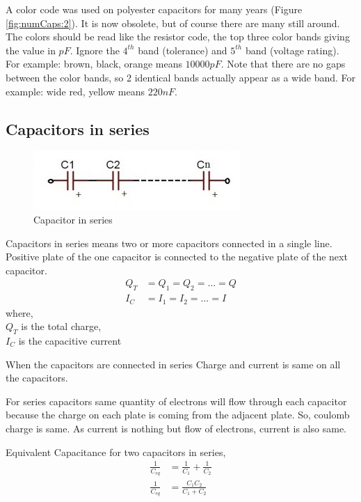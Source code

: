 			A color code was used on polyester capacitors for many years (Figure \ref{fig:numCaps:2}). It is now obsolete, but of course there are many still around. The colors should be read like the resistor code, the top three color bands giving the value in $pF$. Ignore the $4^{th}$ band (tolerance) and $5^{th}$ band (voltage rating). For example: brown, black, orange means $10000pF$. Note that there are no gaps between the color bands, so 2 identical bands actually appear as a wide band. For example: wide red, yellow means $220nF$.
			
		\subsection{Capacitors in series}
			\begin{figure}[h]
				\centering
				\includegraphics[width=0.5\linewidth]{img/exp2/10}
				\caption{Capacitor in series}
				\label{fig:capsInSeries}
			\end{figure}
		
			Capacitors in series means two or more capacitors connected in a single line. Positive plate of the one capacitor is connected to the negative plate of the next capacitor.
			\begin{align*}
				Q_T &= Q_1 = Q_2 = \ldots = Q \\
				I_C &= I_1 = I_2 = \ldots = I
			\end{align*}
			where,\\
			$Q_T$ is the total charge,\\
			$I_C$ is the capacitive current
			
			When the capacitors are connected in series Charge and current is same on all the capacitors.
			
			For series capacitors same quantity of electrons will flow through each capacitor because the charge on each plate is coming from the adjacent plate. So, coulomb charge is same. As current is nothing but flow of electrons, current is also same.
			
			
			Equivalent Capacitance for two capacitors in series,
			\begin{align*}
				\frac{1}{C_{eq}} &= \frac{1}{C_1} + \frac{1}{C_2} \\
				\frac{1}{C_{eq}} &= \frac{C_1 C_2}{C_1 + C_2}
			\end{align*}
		
